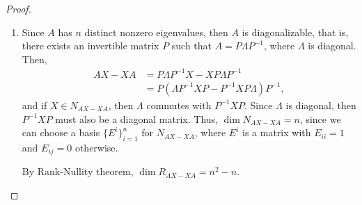 \documentclass[11pt]{article}
\theoremstyle{definition}
\numberwithin{equation}{subsection}
\begin{document}
\begin{proof}
~\begin{enumerate}[label=(\alph*)]
    \item Since $A$ has $n$ distinct nonzero eigenvalues, then $A$ is diagonalizable, that is, there exists an invertible matrix $P$ such that $A = P \Lambda P^{-1}$, where $\Lambda$ is diagonal. Then, 
    \begin{align*}
        AX - XA & = P \Lambda P^{-1} X - X P \Lambda P^{-1} \\
        & = P \left(\Lambda P^{-1} X P - P^{-1} X P \Lambda \right) P^{-1},
    \end{align*}
    and if $X \in N_{AX - XA}$, then $\Lambda$ commutes with $P^{-1} X P$. Since $\Lambda$ is diagonal, then $P^{-1} X P$ must also be a diagonal matrix. Thus, $\dim N_{AX - XA} = n$, since we can choose a basis $\{E^i\}^n_{i=1}$ for $N_{AX - XA}$, where $E^i$ is a matrix with $E_{ii} = 1$ and $E_{ij} = 0$ otherwise. 
    
    By Rank-Nullity theorem, $\dim R_{AX - XA} = n^2 - n$. 
    

\end{enumerate}
\end{proof}
\end{document}
